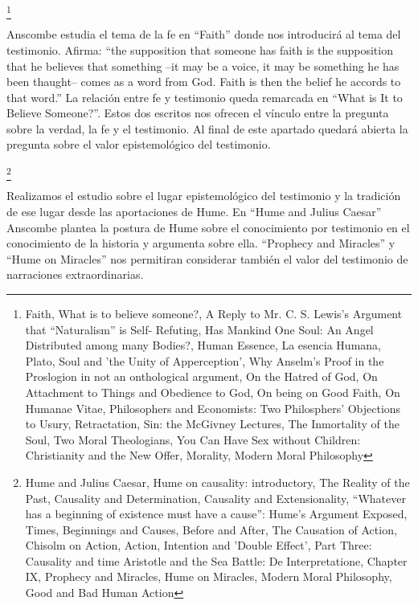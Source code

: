 \documentclass[11pt]{article}
\begin{document}
{\begin{spacing}{1.5}
\tab{}
\footnote{
Faith, 
What is to believe someone?, 
A Reply to Mr. C. S. Lewis's Argument that “Naturalism” is Self- Refuting, 
Has Mankind One Soul: An Angel Distributed among many Bodies?, 
Human Essence, 
La esencia Humana, 
Plato, Soul and 'the Unity of Apperception', 
Why Anselm's Proof in the Proslogion in not an onthological argument, 
On the Hatred of God, 
On Attachment to Things and Obedience to God, 
On being on Good Faith, 
On Humanae Vitae, 
Philosophers and Economists: Two Philosphers' Objections to Usury, 
Retractation, 
Sin: the McGivney Lectures, 
The Inmortality of the Soul, 
Two Moral Theologians, 
You Can Have Sex without Children: Christianity and the New Offer, 
Morality, 
Modern Moral Philosophy
}

\begin{spacing}{1}
Anscombe estudia el tema de la fe en ``Faith'' donde nos introducirá al tema del testimonio. Afirma: ``the supposition that someone has faith is the supposition that he believes that something --it may be a voice, it may be something he has been thaught-- comes as a word from God. Faith is then the belief he accords to that word.'' La relación entre fe y testimonio queda remarcada en ``What is It to Believe Someone?''. Estos dos escritos nos ofrecen el vínculo entre la pregunta sobre la verdad, la fe y el testimonio. Al final de este apartado quedará abierta la pregunta sobre el valor epistemológico del testimonio.
\end{spacing}

\tab{}
\footnote{
Hume and Julius Caesar, 
Hume on causality: introductory, 
The Reality of the Past, 
Causality and Determination, 
Causality and Extensionality, 
“Whatever has a beginning of existence must have a cause”: Hume's Argument Exposed, 
Times, Beginnings and Causes, 
Before and After, 
The Causation of Action, 
Chisolm on Action, 
Action, Intention and 'Double Effect', 
Part Three: Causality and time
Aristotle and the Sea Battle: De Interpretatione, Chapter IX, 
Prophecy and Miracles, 
Hume on Miracles, 
Modern Moral Philosophy, 
Good and Bad Human Action
}

\begin{spacing}{1}
Realizamos el estudio sobre el lugar epistemológico del testimonio y la tradición de ese lugar desde las aportaciones de Hume. En ``Hume and Julius Caesar'' Anscombe plantea la postura de Hume sobre el conocimiento por testimonio en el conocimiento de la historia y argumenta sobre ella. ``Prophecy and Miracles'' y ``Hume on Miracles'' nos permitiran considerar también el valor del testimonio de narraciones extraordinarias. 
\end{spacing}


\end{spacing}}
\end{document}
